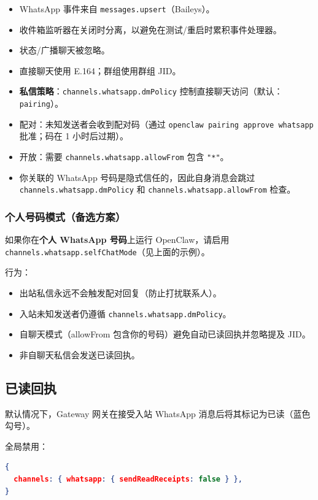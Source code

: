 \begin{itemize}
  \item WhatsApp 事件来自 \texttt{messages.upsert}（Baileys）。
  \item 收件箱监听器在关闭时分离，以避免在测试/重启时累积事件处理器。
  \item 状态/广播聊天被忽略。
  \item 直接聊天使用 E.164；群组使用群组 JID。
  \item \textbf{私信策略}：\texttt{channels.whatsapp.dmPolicy} 控制直接聊天访问（默认：\texttt{pairing}）。
  \item 配对：未知发送者会收到配对码（通过 \texttt{openclaw pairing approve whatsapp } 批准；码在 1 小时后过期）。
  \item 开放：需要 \texttt{channels.whatsapp.allowFrom} 包含 \texttt{"*"}。
  \item 你关联的 WhatsApp 号码是隐式信任的，因此自身消息会跳过 \texttt{channels.whatsapp.dmPolicy} 和 \texttt{channels.whatsapp.allowFrom} 检查。
\end{itemize}


\subsubsection{个人号码模式（备选方案）}


如果你在\textbf{个人 WhatsApp 号码}上运行 OpenClaw，请启用 \texttt{channels.whatsapp.selfChatMode}（见上面的示例）。

行为：

\begin{itemize}
  \item 出站私信永远不会触发配对回复（防止打扰联系人）。
  \item 入站未知发送者仍遵循 \texttt{channels.whatsapp.dmPolicy}。
  \item 自聊天模式（allowFrom 包含你的号码）避免自动已读回执并忽略提及 JID。
  \item 非自聊天私信会发送已读回执。
\end{itemize}


\subsection{已读回执}


默认情况下，Gateway 网关在接受入站 WhatsApp 消息后将其标记为已读（蓝色勾号）。

全局禁用：

\begin{lstlisting}[language=json]
{
  channels: { whatsapp: { sendReadReceipts: false } },
}
\end{lstlisting}


